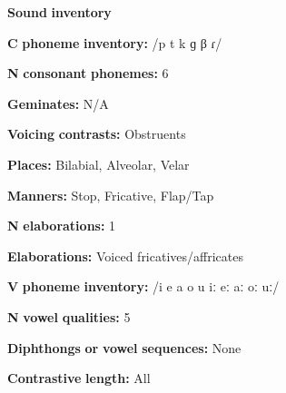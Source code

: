 \begin{styleBody}
\textbf{Sound} \textbf{inventory}
\end{styleBody}

\begin{styleBody}
\textbf{C} \textbf{phoneme} \textbf{inventory:} /p t k ɡ β ɾ/
\end{styleBody}

\begin{styleBody}
\textbf{N} \textbf{consonant} \textbf{phonemes:} 6
\end{styleBody}

\begin{styleBody}
\textbf{Geminates:} N/A
\end{styleBody}

\begin{styleBody}
\textbf{Voicing} \textbf{contrasts:} Obstruents
\end{styleBody}

\begin{styleBody}
\textbf{Places:} Bilabial, Alveolar, Velar
\end{styleBody}

\begin{styleBody}
\textbf{Manners:} Stop, Fricative, Flap/Tap
\end{styleBody}

\begin{styleBody}
\textbf{N} \textbf{elaborations:} 1
\end{styleBody}

\begin{styleBody}
\textbf{Elaborations:} Voiced fricatives/affricates
\end{styleBody}

\begin{styleBody}
\textbf{V} \textbf{phoneme} \textbf{inventory:} /i e a o u iː eː aː oː uː/
\end{styleBody}

\begin{styleBody}
\textbf{N} \textbf{vowel} \textbf{qualities:} 5
\end{styleBody}

\begin{styleBody}
\textbf{Diphthongs} \textbf{or} \textbf{vowel} \textbf{sequences:} None
\end{styleBody}

\begin{styleBody}
\textbf{Contrastive} \textbf{length:} All
\end{styleBody}

